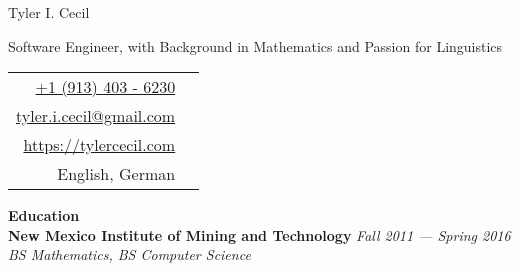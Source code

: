 \documentclass[11pt,a4paper,sans]{article}
\newcommand{\cvcolor}[1]{{\color{MidnightBlue}#1}}
\renewcommand{\section}[1]{
  \cvcolor{\noindent \textbf{\LARGE #1}}
  \vspace{.5em}\\
}
\begin{document}
\noindent
\begin{minipage}{0.675\linewidth}
 {
 \fontsize{40pt}{50pt}\selectfont
 \noindent
 {Tyler I. Cecil}}\\
 {\Large \color{darkgray} {
   \vspace{-0.75em}

   \noindent
   Software Engineer, with Background in Mathematics
   and Passion for Linguistics
 }}
\end{minipage}
\hfill
\begin{tabular}{|rl}
  \href{tel:+1 (913) 403 - 6230}{+1 (913) 403 - 6230}&\cvcolor{\faPhone} \\
  \href{mailto:tyler.i.cecil@gmail.com}{tyler.i.cecil@gmail.com}&\cvcolor{\faEnvelope} \\
  \href{https://tylercecil.com}{https://tylercecil.com}&\cvcolor{\faGlobe} \\
  English, German & \cvcolor{\faLanguage} \\
\end{tabular}

\vspace{0.5em}
\hline
\vspace{1em}

\section{Education}
\textbf{New Mexico Institute of Mining and Technology} \hfill \textsl{Fall 2011 --- Spring 2016}\\
\textsl{BS Mathematics, BS Computer Science}\\
\end{document}
